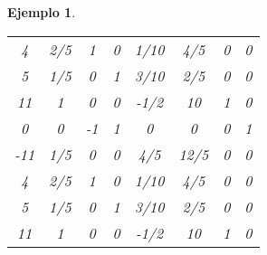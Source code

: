 \documentclass[11pt]{report}
\theoremstyle{mytheorem}
\theoremstyle{mydefinition}
\theoremstyle{myexample}
\newtheorem*{example}{Ejemplo}
\begin{document}
\begin{example}
\begin{center}
\begin{tabular}{|c|c|c|c|c|c|c|c|}
    \phantom{-}4 & \multicolumn{1}{c}{\phantom{-}2/5} & \multicolumn{1}{c}{\phantom{-}1} & \multicolumn{1}{c}{\phantom{-}0} & \multicolumn{1}{c}{\phantom{-}1/10}& \multicolumn{1}{c}{\phantom{-}4/5} & \multicolumn{1}{c}{0} & \multicolumn{1}{c|}{\phantom{-}0} \\

    \phantom{-}5 & \multicolumn{1}{c}{\phantom{-}1/5} & \multicolumn{1}{c}{\phantom{-}0} & \multicolumn{1}{c}{\phantom{-}1} & \multicolumn{1}{c}{\phantom{-}3/10}& \multicolumn{1}{c}{\phantom{-}2/5} & \multicolumn{1}{c}{0} & \multicolumn{1}{c|}{\phantom{-}0} \\
    
    \phantom{-}11 & \multicolumn{1}{c}{\phantom{-}1} & \multicolumn{1}{c}{\phantom{-}0} & \multicolumn{1}{c}{\phantom{-}0} & \multicolumn{1}{c}{-1/2}& \multicolumn{1}{c}{\phantom{-}10} & \multicolumn{1}{c}{1} & \multicolumn{1}{c|}{\phantom{-}0} \\
    
    \phantom{-}0 & \multicolumn{1}{c}{\phantom{-}0} & \multicolumn{1}{c}{-1} & \multicolumn{1}{c}{\phantom{-}1} & \multicolumn{1}{c}{\phantom{-}0}& \multicolumn{1}{c}{\phantom{-}0} & \multicolumn{1}{c}{0} & \multicolumn{1}{c|}{\phantom{-}1} \\ \cline{1-8}
    
    -11 & \multicolumn{1}{c}{\phantom{-}1/5} & \multicolumn{1}{c}{\phantom{-}0} & \multicolumn{1}{c}{\phantom{-}0} & \multicolumn{1}{c}{\phantom{-}4/5} & \multicolumn{1}{c}{\phantom{-}12/5} & \multicolumn{1}{c}{0} & \multicolumn{1}{c|}{\phantom{-}0} \\ \hhline{|=|=|=|=|=|=|=|=|}

    \phantom{-}4 & \multicolumn{1}{c}{\phantom{-}2/5} & \multicolumn{1}{c}{\phantom{-}1} & \multicolumn{1}{c}{\phantom{-}0} & \multicolumn{1}{c}{\phantom{-}1/10}& \multicolumn{1}{c}{\phantom{-}4/5} & \multicolumn{1}{c}{0} & \multicolumn{1}{c|}{\phantom{-}0} \\

    \phantom{-}5 & \multicolumn{1}{c}{\phantom{-}1/5} & \multicolumn{1}{c}{\phantom{-}0} & \multicolumn{1}{c}{\phantom{-}1} & \multicolumn{1}{c}{\phantom{-}3/10}& \multicolumn{1}{c}{\phantom{-}2/5} & \multicolumn{1}{c}{0} & \multicolumn{1}{c|}{\phantom{-}0} \\
    
    \phantom{-}11 & \multicolumn{1}{c}{\phantom{-}1} & \multicolumn{1}{c}{\phantom{-}0} & \multicolumn{1}{c}{\phantom{-}0} & \multicolumn{1}{c}{-1/2}& \multicolumn{1}{c}{\phantom{-}10} & \multicolumn{1}{c}{1} & \multicolumn{1}{c|}{\phantom{-}0} \\
    

\end{tabular}
\end{center}
\end{example}
\end{document}
